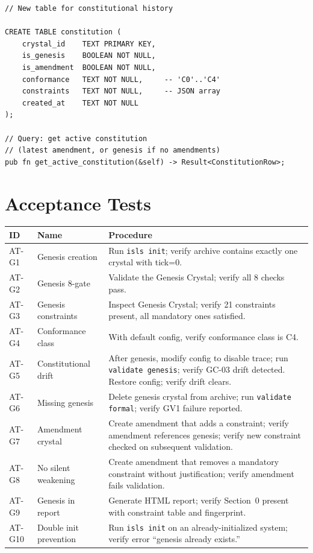 \documentclass[11pt,a4paper,twoside]{article}
\theoremstyle{definition}
\theoremstyle{plain}
\theoremstyle{remark}
\begin{document}
\begin{lstlisting}
// New table for constitutional history

CREATE TABLE constitution (
    crystal_id    TEXT PRIMARY KEY,
    is_genesis    BOOLEAN NOT NULL,
    is_amendment  BOOLEAN NOT NULL,
    conformance   TEXT NOT NULL,     -- 'C0'..'C4'
    constraints   TEXT NOT NULL,     -- JSON array
    created_at    TEXT NOT NULL
);

// Query: get active constitution
// (latest amendment, or genesis if no amendments)
pub fn get_active_constitution(&self) -> Result<ConstitutionRow>;
\end{lstlisting}


\part{Acceptance Tests}\label{part:tests}

\begin{longtable}{l l p{6.5cm}}
\toprule
\textbf{ID} & \textbf{Name} & \textbf{Procedure} \\
\midrule
\endfirsthead \midrule \endhead \bottomrule \endfoot
AT-G1 & Genesis creation & Run \texttt{isls init}; verify archive
  contains exactly one crystal with tick=0. \\
AT-G2 & Genesis 8-gate & Validate the Genesis Crystal; verify all
  8 checks pass. \\
AT-G3 & Genesis constraints & Inspect Genesis Crystal; verify 21
  constraints present, all mandatory ones satisfied. \\
AT-G4 & Conformance class & With default config, verify conformance
  class is C4. \\
AT-G5 & Constitutional drift & After genesis, modify config to
  disable trace; run \texttt{validate genesis}; verify GC-03 drift
  detected. Restore config; verify drift clears. \\
AT-G6 & Missing genesis & Delete genesis crystal from archive; run
  \texttt{validate formal}; verify GV1 failure reported. \\
AT-G7 & Amendment crystal & Create amendment that adds a constraint;
  verify amendment references genesis; verify new constraint
  checked on subsequent validation. \\
AT-G8 & No silent weakening & Create amendment that removes a
  mandatory constraint without justification; verify amendment
  fails validation. \\
AT-G9 & Genesis in report & Generate HTML report; verify Section~0
  present with constraint table and fingerprint. \\
AT-G10 & Double init prevention & Run \texttt{isls init} on an
  already-initialized system; verify error ``genesis already
  exists.'' \\
\end{longtable}
\end{document}
